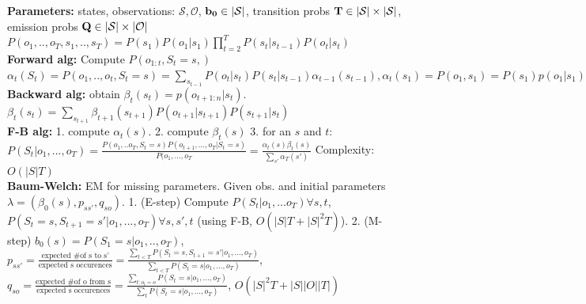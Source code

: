  {\bf Parameters: } states, observations: $\mathcal{S, O}$,  $\mathbf{b_0}  \in | \mathcal{S} |$, transition probs $\mathbf{T} \in | \mathcal{S} | \times | \mathcal{S} |$, emission probs $\mathbf{Q} \in |\mathcal{S}| \times |\mathcal{O}|$ \\
 $P(o_1, ..,o_T, s_1, .., s_T) = P(s_1)P(o_1 \vert s_1) \prod_{t=2}^T P(s_t \vert s_{t-1})P(o_t \vert s_t)$\\
 {\bf Forward alg:} Compute $P(o_{1:t}, S_t=s, )$ $\alpha_t(S_t) = P(o_1,..,o_t, S_t = s) = \sum_{s_{t-1}}P(o_{t} \vert s_{t}) P(s_{t} \vert s_{t-1}) \alpha_{t-1}(s_{t-1}), \alpha_{t}(s_1) = P(o_1, s_1) = P(s_1)p(o_1 \vert s_1)$\\
 {\bf Backward alg: } obtain $\beta_{t}(s_t) = p(o_{t+1:n} \vert s_t)$. $\beta_{t}(s_t) = \sum_{s_{t+1}} \beta_{t+1}(s_{t+1}) P(o_{t+1} \vert s_{t+1}) P(s_{t+1} \vert s_t)$\\
 {\bf F-B alg: } 1. compute $\alpha_{t}(s)$. 2. compute $\beta_{t}(s)$ 3. for an $s$ and $t$: $P(S_t \vert o_1, ..., o_T) = \frac{P(o_1, .. o_T, S_t = s) P(o_{t+1}, ..., o_T \vert S_t = s)}{P(o_1, ..., o_T} = \frac{\alpha_{t}(s) \beta_{t}(s)}{\sum_{s'}\alpha_{T}(s')}$ Complexity: $O(|S|T)$\\
 {\bf Baum-Welch:} EM for missing parameters. Given obs. and initial parameters $\lambda = (\beta_0(s), p_{ss'}, q_{so})$. 1. (E-step) Compute $P(S_t \vert o_1,...o_T) \forall s, t$, $P(S_t =s, S_{t+1} = s' \vert o_1, ..., o_T) \forall s, s', t$ (using F-B, $O(|S|T + |S|^2T)$). 2. (M-step) $b_0(s) = P(S_1 = s \vert o_1, .., o_T)$, $p_{ss'} = \frac{\text{expected \# of s to s'}}{\text{expected s occurences}} = \frac{\sum_{t<T} P(S_t = s, S_{t+1} = s' \vert o_1, ..., o_T)}{ \sum_{t<T} P(S_t =s \vert o_1, ..., o_T)}$, $q_{so} = \frac{\text{expected \# of o from s}}{\text{expected s occurences}} = \frac{\sum_{t:o_t=o} P(S_t = s \vert o_1, ..., o_T)}{ \sum_{t} P(S_t =s \vert o_1, ..., o_T)}$, $O(|S|^2T + |S||O||T|)$\\
 
